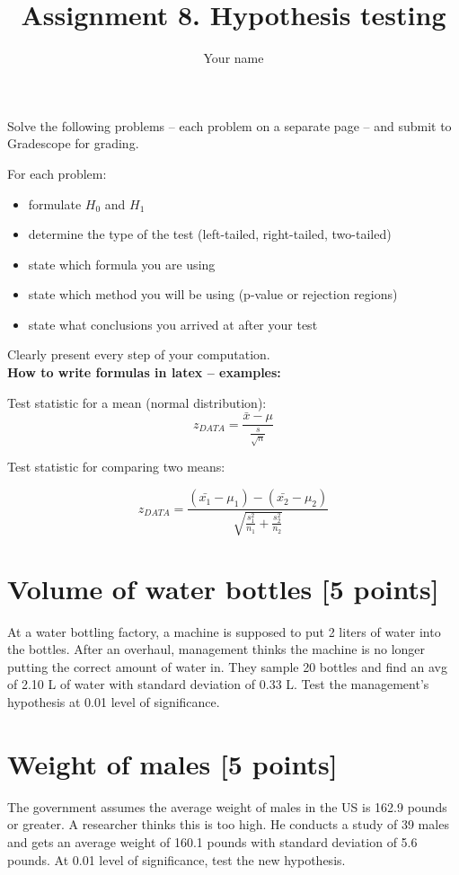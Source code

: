 \documentclass{article}
\title{Assignment 8. Hypothesis testing}
\author{Your name}
\begin{document}
\maketitle


Solve the following problems -- each problem on a separate page -- and submit to Gradescope for grading. 

For each problem: 
\begin{itemize}
\item formulate $H_0$ and $H_1$
\item determine the type of the test (left-tailed, right-tailed, two-tailed)
\item state which formula you are using 
\item state which method you will be using (p-value or rejection regions)
\item state what conclusions you arrived at after your test
\end{itemize}

Clearly present every step of your computation.\\ 

{\bf How to write formulas in latex -- examples:}

Test statistic for a mean (normal distribution):
$$z_{DATA}=\frac{\bar{x}-\mu}{\frac{s}{\sqrt{n}}}$$

Test statistic for comparing two means:

$$z_{DATA}=\frac{(\bar{x_1}-\mu_1) - (\bar{x_2}-\mu_2)}{\sqrt{\frac{s_1^2}{n_1}+\frac{s_2^2}{n_2}}}$$

\newpage
\section{Volume of water bottles [5 points]}
At a water bottling factory, a machine is supposed to put 2 liters of water into the bottles. 
After an overhaul, management thinks the machine is no longer putting the correct amount of water in. 
They sample 20 bottles and find an avg of 2.10 L of water with standard deviation of 0.33 L. 
Test the management's hypothesis at 0.01 level of significance.
\\




\newpage
\section{Weight of males [5 points]}
The government assumes the average weight of males in the US is 162.9 pounds or greater. 
A researcher thinks this is too high. 
He conducts a study of 39 males and gets an average weight of 160.1 pounds with standard deviation of 5.6 pounds. 
At 0.01 level of significance, test the new hypothesis.\\ 
\end{document}
